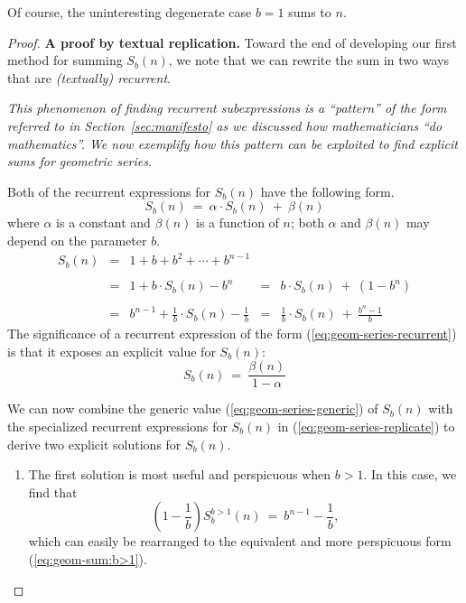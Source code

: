 Of course, the uninteresting degenerate case $b=1$ sums to $n$.

\begin{proof}
{\bf A proof by textual replication.}
%
Toward the end of developing our first method for summing $S_{b}(n)$,
we note that we can rewrite the sum in two ways that are {\em
  (textually) recurrent}.

\bigskip

\noindent
{\em This phenomenon of {\em finding recurrent subexpressions} is a
  ``pattern'' of the form referred to in Section~\ref{sec:manifesto}
  as we discussed how mathematicians ``do mathematics''.  We now
  exemplify how this pattern can be exploited to find explicit sums
  for geometric series.}

\bigskip

Both of the recurrent expressions for $S_{b}(n)$ have the following form.
\begin{equation}
\label{eq:geom-series-recurrent}
S_b(n) \ = \ \alpha \cdot S_b(n) \ + \ \beta(n)
\end{equation}
where $\alpha$ is a constant and $\beta(n)$ is a function of $n$; both
$\alpha$ and $\beta(n)$ may depend on the parameter $b$.
\begin{equation}
\label{eq:geom-series-replicate}
\begin{array}{cclcl}
S_{b}(n) 
  & = &
1+ b + b^2 + \cdots + b^{n-1} & & \\
  &   &   &  & \\
  & = &
1 + b \cdot S_{b}(n) - b^n
   & = & b \cdot S_{b}(n) \ + \ (1 - b^n) \\
  &   &   &  & \\
  & = &
{\displaystyle
b^{n-1} + \frac{1}{b} \cdot S_{b}(n) - \frac{1}{b}
}
  & = &
{\displaystyle \frac{1}{b} \cdot S_{b}(n) \ + \ \frac{b^n -1}{b} 
}
\end{array}
\end{equation}
The significance of a recurrent expression of the form
(\ref{eq:geom-series-recurrent}) is that it exposes an explicit value
for $S_b(n)$:
\begin{equation}
\label{eq:geom-series-generic}
S_b(n) \ = \ \frac{\beta(n)}{1 - \alpha}
\end{equation}

We can now combine the generic value (\ref{eq:geom-series-generic}) of
$S_b(n)$ with the specialized recurrent expressions for $S_b(n)$ in
(\ref{eq:geom-series-replicate}) to derive two explicit solutions for
$S_b(n)$.
\begin{enumerate}
\item
The first solution is most useful and perspicuous when $b>1$.  In this
case, we find that
\[ \left( 1 - \frac{1}{b} \right)  S^{b>1}_{b}(n) \ = \ b^{n-1} -
\frac{1}{b}, \]
which can easily be rearranged to the equivalent and more
perspicuous form (\ref{eq:geom-sum:b>1}).


\end{enumerate}
\end{proof}
